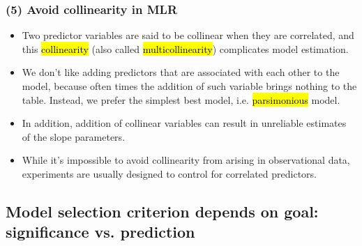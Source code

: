 \documentclass[slidestop,compress,mathserif,12pt,t,professionalfonts,xcolor=table]{beamer}
\begin{document}
\begin{frame}
\frametitle{(5) Avoid collinearity in MLR}

\begin{itemize}

\item Two predictor variables are said to be collinear when they are correlated, and this \hl{collinearity} (also called \hl{multicollinearity}) complicates model estimation. \\

\pause

\item We don't like adding predictors that are associated with each other to the model, because often times the addition of such variable brings nothing to the table. Instead, we prefer the simplest best model, i.e. \hl{parsimonious} model.

\pause

\item In addition, addition of collinear variables can result in unreliable estimates of the slope parameters.

\pause

\item While it's impossible to avoid collinearity from arising in observational data, experiments are usually designed to control for correlated predictors.

\end{itemize}

\end{frame}


\subsection{Model selection criterion depends on goal: significance vs. prediction}
\label{mi6}

\end{document}

